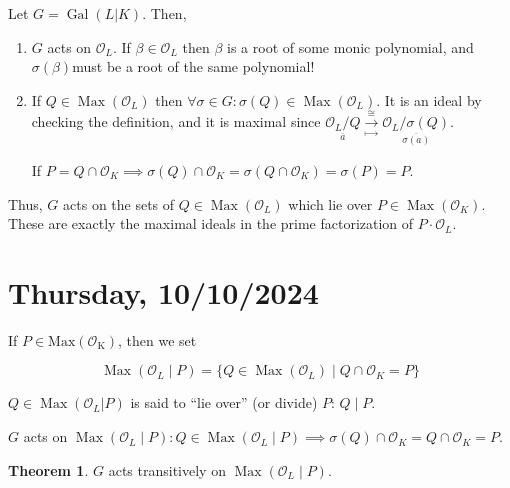 \documentclass[openany]{amsbook}
\numberwithin{section}{chapter}
\theoremstyle{definition}
\newtheorem{theorem}{Theorem}[chapter]
\begin{document}
Let \(G = \operatorname{Gal}(L|K)\). Then,

\begin{enumerate}[label=\arabic*)]
    \item \(G\) acts on \(\mathcal{O}_L\). If \(\beta \in \mathcal{O}_L\) then \(\beta\) is a root of some monic polynomial, and \(\sigma(\beta)\)must be a root of the same polynomial!
    \item If \(Q\in \operatorname{Max}(\mathcal{O}_L)\) then \(\forall \sigma \in G: \sigma (Q) \in \operatorname{Max}(\mathcal{O}_L)\). It is an ideal by checking the definition, and it is maximal since \(\underset{\overline{a}}{\mathcal{O}_L / Q} \underset{\mapsto}{\overset{\cong}{\to}} \underset{\overline{\sigma(a)}}{\mathcal{O}_L / \sigma(Q)}\). 
    
    If \(P = Q\cap \mathcal{O}_K \implies \sigma(Q) \cap \mathcal{O}_K = \sigma (Q\cap \mathcal{O}_K) = \sigma (P) = P\). 

\end{enumerate} 

Thus, \(G\) acts on the sets of \(Q\in \operatorname{Max}(\mathcal{O}_L)\) which lie over \(P\in \operatorname{Max}(\mathcal{O}_K)\). These are exactly the maximal ideals in the prime factorization of \(P\cdot \mathcal{O}_L\). 


\section*{Thursday, 10/10/2024}

If \(P\in \operatorname{Max(\mathcal{O} _K)}\), then we set 

\[
    \operatorname{Max} (\mathcal{O} _L \mid P) = \{ Q \in \operatorname{Max} (\mathcal{O} _L) \mid Q\cap \mathcal{O} _K = P \} 
\]

\(Q\in \operatorname{Max} (\mathcal{O}_L | P)\) is said to ``lie over'' (or divide) \(P\): \(Q \mid P\).

\(G\) acts on \(\operatorname{Max}(\mathcal{O}_L \mid P): Q \in \operatorname{Max}(\mathcal{O}_L \mid P) \implies \sigma (Q) \cap \mathcal{O} _K = Q\cap \mathcal{O} _K = P\).

\begin{theorem}
    \(G\) acts transitively on \(\operatorname{Max} (\mathcal{O}_L \mid P)\). 
\end{theorem}
\end{document}
